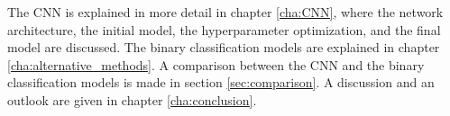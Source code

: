 The CNN is explained in more detail in chapter \ref{cha:CNN}, where the network architecture, the initial model, the hyperparameter optimization, and the final model are discussed.
The binary classification models are explained in chapter \ref{cha:alternative_methods}.
A comparison between the CNN and the binary classification models is made in section \ref{sec:comparison}.
A discussion and an outlook are given in chapter \ref{cha:conclusion}.




